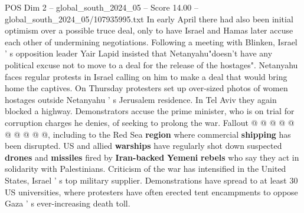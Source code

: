 \begin{textsample}{POS Dim 2 – global\_south\_2024\_05 – Score 14.00 – global\_south\_2024\_05/107935995.txt}
In early April there had also been initial optimism over a possible truce deal, only to have Israel and Hamas later accuse each other of undermining negotiations.
Following a meeting with Blinken, Israel ' s opposition leader Yair Lapid insisted that Netanyahu"doesn't have any political excuse not to move to a deal for the release of the hostages".
Netanyahu faces regular protests in Israel calling on him to make a deal that would bring home the captives.
On Thursday protesters set up over-sized photos of women hostages outside Netanyahu ' s Jerusalem residence.
In Tel Aviv they again blocked a highway.
Demonstrators accuse the prime minister, who is on trial for corruption charges he denies, of seeking to prolong the war.
Fallout @ @ @ @ @ @ @ @ @ @, including to the Red Sea \textbf{region} where commercial \textbf{shipping} has been disrupted.
US and allied \textbf{warships} have regularly shot down suspected \textbf{drones} and \textbf{missiles} fired by \textbf{Iran-backed} \textbf{Yemeni} \textbf{rebels} who say they act in solidarity with Palestinians.
Criticism of the war has intensified in the United States, Israel ' s top military supplier.
Demonstrations have spread to at least 30 US universities, where protesters have often erected tent encampments to oppose Gaza ' s ever-increasing death toll.

\end{textsample}
